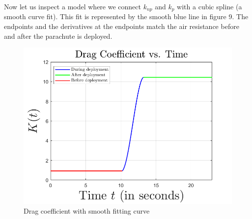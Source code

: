 \documentclass{article}
\begin{document}
    Now let us inspect a model where we connect $k_{np}$ and $k_p$ with a cubic spline (a smooth curve fit). This fit is represented by the smooth blue line in figure 9. The endpoints and the derivatives at the endpoints match the air resistance before and after the parachute is deployed.
    \begin{figure}[H]
        \centering
        \includegraphics[scale = 0.45]{drag coefficient plot}
        \caption{Drag coefficient with smooth fitting curve}
    \end{figure}
\end{document}
